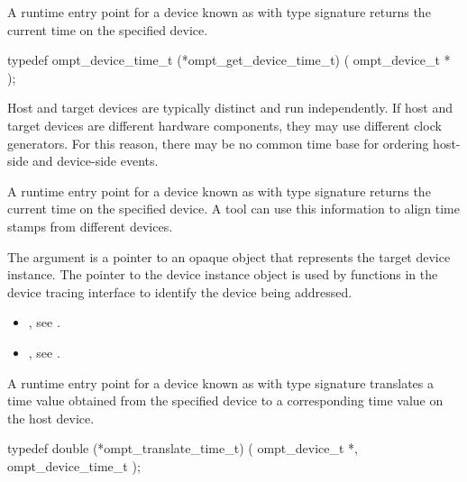 \summary
A runtime entry point for a device known
as 
with type signature 
returns the current time on the specified device.

\format
\begin{ccppspecific}
\begin{omptInquiry}
typedef ompt_device_time_t (*ompt_get_device_time_t) (
  ompt_device_t *
);
\end{omptInquiry}
\end{ccppspecific}

\descr
Host and target devices are typically distinct and run independently.
If host and target devices are different hardware components, they
may use different clock generators. For this reason,  there may be
no common time base for ordering host-side and device-side events.

A runtime entry point for a device known
as  with type signature
returns the current time on the specified device.
A tool can use this information
to align time stamps from different devices.

\argdesc

The argument  is a pointer to an opaque object that
represents the target device instance. The pointer to the device
instance object is used by functions in the device tracing interface
to identify the device being addressed.

\crossreferences
\begin{itemize}
\item {},
see .
\item {},
see .
\end{itemize}

\label{sec:ompt_translate_time_t}

\summary
A runtime entry point for a device known
as 
with type signature  translates
a time value obtained from the specified device to a corresponding time
value on the host device.

\format
\begin{ccppspecific}
\begin{omptInquiry}
typedef double (*ompt_translate_time_t) (
  ompt_device_t *,
  ompt_device_time_t 
);
\end{omptInquiry}
\end{ccppspecific}

